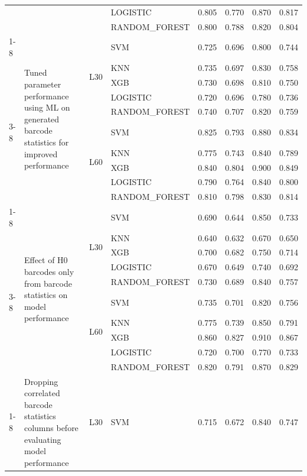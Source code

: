 \begin{table}
\begin{tabular}{llllrrrr}
 &  &  & LOGISTIC & 0.805 & 0.770 & 0.870 & 0.817 \\
 &  &  & RANDOM\_FOREST & 0.800 & 0.788 & 0.820 & 0.804 \\
\cline{1-8} \cline{2-8} \cline{3-8}
\multirow[t]{10}{*}{Experiment 4} & \multirow[t]{10}{*}{Tuned parameter performance using ML on generated barcode statistics for improved performance} & \multirow[t]{5}{*}{L30} & SVM & 0.725 & 0.696 & 0.800 & 0.744 \\
 &  &  & KNN & 0.735 & 0.697 & 0.830 & 0.758 \\
 &  &  & XGB & 0.730 & 0.698 & 0.810 & 0.750 \\
 &  &  & LOGISTIC & 0.720 & 0.696 & 0.780 & 0.736 \\
 &  &  & RANDOM\_FOREST & 0.740 & 0.707 & 0.820 & 0.759 \\
\cline{3-8}
 &  & \multirow[t]{5}{*}{L60} & SVM & 0.825 & 0.793 & 0.880 & 0.834 \\
 &  &  & KNN & 0.775 & 0.743 & 0.840 & 0.789 \\
 &  &  & XGB & 0.840 & 0.804 & 0.900 & 0.849 \\
 &  &  & LOGISTIC & 0.790 & 0.764 & 0.840 & 0.800 \\
 &  &  & RANDOM\_FOREST & 0.810 & 0.798 & 0.830 & 0.814 \\
\cline{1-8} \cline{2-8} \cline{3-8}
\multirow[t]{10}{*}{Experiment 5} & \multirow[t]{10}{*}{Effect of H0 barcodes only from barcode statistics on model performance} & \multirow[t]{5}{*}{L30} & SVM & 0.690 & 0.644 & 0.850 & 0.733 \\
 &  &  & KNN & 0.640 & 0.632 & 0.670 & 0.650 \\
 &  &  & XGB & 0.700 & 0.682 & 0.750 & 0.714 \\
 &  &  & LOGISTIC & 0.670 & 0.649 & 0.740 & 0.692 \\
 &  &  & RANDOM\_FOREST & 0.730 & 0.689 & 0.840 & 0.757 \\
\cline{3-8}
 &  & \multirow[t]{5}{*}{L60} & SVM & 0.735 & 0.701 & 0.820 & 0.756 \\
 &  &  & KNN & 0.775 & 0.739 & 0.850 & 0.791 \\
 &  &  & XGB & 0.860 & 0.827 & 0.910 & 0.867 \\
 &  &  & LOGISTIC & 0.720 & 0.700 & 0.770 & 0.733 \\
 &  &  & RANDOM\_FOREST & 0.820 & 0.791 & 0.870 & 0.829 \\
\cline{1-8} \cline{2-8} \cline{3-8}
\multirow[t]{10}{*}{Experiment 6} & \multirow[t]{10}{*}{Dropping correlated barcode statistics columns before evaluating model performance} & \multirow[t]{5}{*}{L30} & SVM & 0.715 & 0.672 & 0.840 & 0.747 \\

\end{tabular}
\end{table}
